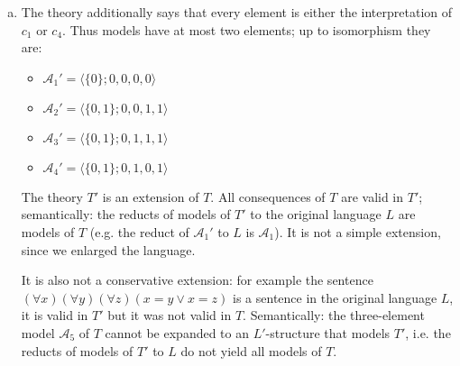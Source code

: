 \begin{problem}
\begin{solution}
\begin{enumerate}[(a)]
            \item The theory additionally says that every element is either the interpretation of $c_1$ or $c_4$. Thus models have at most two elements; up to isomorphism they are:
            \begin{itemize}
                \item $\mathcal A_1'=\langle\{0\};0,0,0,0\rangle$
                \item $\mathcal A_2'=\langle\{0,1\};0,0,1,1\rangle$
                \item $\mathcal A_3'=\langle\{0,1\};0,1,1,1\rangle$
                \item $\mathcal A_4'=\langle\{0,1\};0,1,0,1\rangle$                
            \end{itemize}
            The theory $T'$ is an extension of $T$. All consequences of $T$ are valid in $T'$; semantically: the reducts of models of $T'$ to the original language $L$ are models of $T$ (e.g. the reduct of $\mathcal A_1'$ to $L$ is $\mathcal A_1$). It is not a simple extension, since we enlarged the language.
            
            It is also not a conservative extension: for example the sentence $(\forall x)(\forall y)(\forall z)(x=y\lor x=z)$ is a sentence in the original language $L$, it is valid in $T'$ but it was not valid in $T$. Semantically: the three-element model $\mathcal A_5$ of $T$ cannot be expanded to an $L'$-structure that models $T'$, i.e. the reducts of models of $T'$ to $L$ do not yield all models of $T$.

        \end{enumerate}
                    
    \end{solution}

\end{problem}


